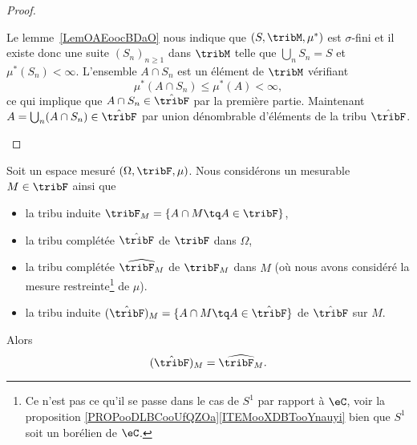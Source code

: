 \begin{proof}
\begin{subproof}
		\spitem[Si \( \mu^*(A)<\infty\)]

		Le lemme~\ref{LemOAEoocBDaO} nous indique que \( (S,\tribM,\mu^*)\) est \( \sigma\)-fini et il existe donc une suite \( (S_n)_{n\geq 1}\) dans \( \tribM\) telle que \( \bigcup_nS_n=S\) et \( \mu^*(S_n)<\infty\). L'ensemble \( A\cap S_n\) est un élément de \( \tribM\) vérifiant
		\begin{equation}
			\mu^*(A\cap S_n)\leq \mu^*(A)<\infty,
		\end{equation}
		ce qui implique que \( A\cap S_n\in\hat\tribF\) par la première partie. Maintenant \( A=\bigcup_n(A\cap S_n)\in\hat\tribF\) par union dénombrable d'éléments de la tribu \( \hat\tribF\).
	\end{subproof}
\end{proof}

\begin{proposition} \label{PROPooAMIEooRomnMG}
	Soit un espace mesuré \( (\Omega,\tribF,\mu)\). Nous considérons un mesurable \( M\in \tribF\) ainsi que
	\begin{itemize}
		\item
		      la tribu induite    \( \tribF_M=\{ A\cap M\tq A\in \tribF \}\),
		\item
		      la tribu complétée  \( \hat\tribF\) de \( \tribF\) dans \( \Omega\),
		\item
		      la tribu complétée  \( \widehat{\tribF_M}\) de \( \tribF_M\) dans \( M\) (où nous avons considéré la mesure restreinte\footnote{Ce n'est pas ce qu'il se passe dans le cas de \( S^1\) par rapport à \( \eC\), voir la proposition \ref{PROPooDLBCooUfQZOa}\ref{ITEMooXDBTooYnauyi} bien que \( S^1\) soit un borélien de \( \eC\).} de \( \mu\)).
		\item
		      la tribu induite    \( (\hat\tribF)_M=\{ A\cap M\tq A\in \hat\tribF \}\) de \( \hat\tribF\) sur \( M\).
	\end{itemize}
	Alors
	\begin{equation}
		(\hat\tribF)_M=\widehat{\tribF_M}.
	\end{equation}
\end{proposition}

